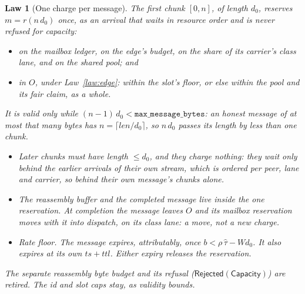 \documentclass[journal]{IEEEtran}
\newtheorem{law}{Law}
\begin{document}
\begin{law}[One charge per message]\label{law:onecharge}
The first chunk $[0,n]$, of length $d_0$, reserves $m=r(n\,d_0)$ once, as an \emph{arrival}
that waits in resource order and is never refused for capacity:
\begin{itemize}[leftmargin=1.2em]
\item on the mailbox ledger, on the edge's budget, on the share of its carrier's class lane,
and on the shared pool; and
\item in $O$, under Law~\ref{law:edge}: within the slot's floor, or else within the pool and
its fair claim, as a whole.
\end{itemize}
It is valid only while $(n-1)\,d_0<\texttt{max\_message\_bytes}$: an honest message of at most
that many bytes has $n=\lceil\mathit{len}/d_0\rceil$, so $n\,d_0$ passes its length by less than
one chunk.
\begin{itemize}[leftmargin=1.2em]
\item Later chunks must have length $\le d_0$, and they charge nothing: they wait only behind
the earlier arrivals of their own stream, which is ordered per peer, lane and carrier, so behind
their own message's chunks alone.
\item The reassembly buffer and the completed message live inside the one reservation.  At
completion the message leaves $O$ and its mailbox reservation moves with it into dispatch, on
its class lane: a move, not a new charge.
\item \emph{Rate floor.}  The message expires, attributably, once
$b<\rho\,\hat\tau-W d_0$.  It also expires at its own $\mathit{ts}+\mathit{ttl}$.  Either
expiry releases the reservation.
\end{itemize}
The separate reassembly byte budget and its refusal ($\mathsf{Rejected}(\mathsf{Capacity})$)
are retired.  The id and slot caps stay, as validity bounds.
\end{law}
\end{document}
